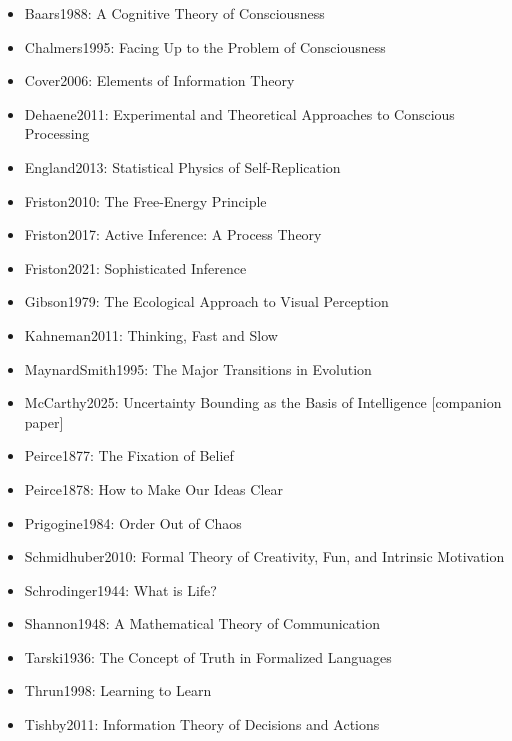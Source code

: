 \documentclass[
]{article}
\providecommand{\tightlist}{%
  \setlength{\itemsep}{0pt}\setlength{\parskip}{0pt}}
\begin{document}
\begin{itemize}
\tightlist
\item
  Baars1988: A Cognitive Theory of Consciousness
\item
  Chalmers1995: Facing Up to the Problem of Consciousness
\item
  Cover2006: Elements of Information Theory
\item
  Dehaene2011: Experimental and Theoretical Approaches to Conscious
  Processing
\item
  England2013: Statistical Physics of Self-Replication
\item
  Friston2010: The Free-Energy Principle
\item
  Friston2017: Active Inference: A Process Theory
\item
  Friston2021: Sophisticated Inference
\item
  Gibson1979: The Ecological Approach to Visual Perception
\item
  Kahneman2011: Thinking, Fast and Slow
\item
  MaynardSmith1995: The Major Transitions in Evolution
\item
  McCarthy2025: Uncertainty Bounding as the Basis of Intelligence
  {[}companion paper{]}
\item
  Peirce1877: The Fixation of Belief
\item
  Peirce1878: How to Make Our Ideas Clear
\item
  Prigogine1984: Order Out of Chaos
\item
  Schmidhuber2010: Formal Theory of Creativity, Fun, and Intrinsic
  Motivation
\item
  Schrodinger1944: What is Life?
\item
  Shannon1948: A Mathematical Theory of Communication
\item
  Tarski1936: The Concept of Truth in Formalized Languages
\item
  Thrun1998: Learning to Learn
\item
  Tishby2011: Information Theory of Decisions and Actions
\end{itemize}
\end{document}
